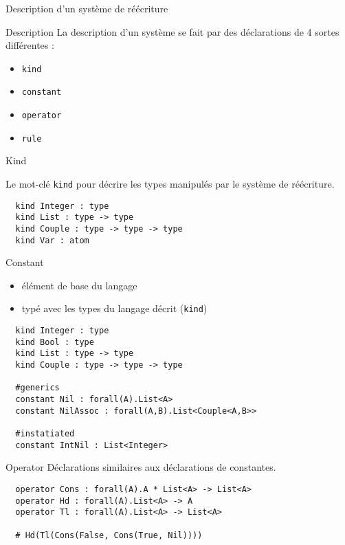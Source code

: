 \begin{frame}{Description d'un système de réécriture}
  \begin{block}{Description}
    La description d'un système se fait par des déclarations de 4
    sortes différentes :
    \begin{itemize}
    \item \verb?kind?
    \item \verb?constant?
    \item \verb?operator?
    \item \verb?rule?
    \end{itemize}
  \end{block}
\end{frame}

\begin{frame}[fragile]{Kind}

  Le mot-clé \verb?kind? pour décrire les types manipulés par le
  système de réécriture.
\begin{verbatim}
  kind Integer : type
  kind List : type -> type
  kind Couple : type -> type -> type
  kind Var : atom
\end{verbatim}
\end{frame}

\begin{frame}[fragile]{Constant}
  \begin{itemize}
  \item élément de base du langage
  \item typé avec les types du langage décrit (\verb?kind?)
  \end{itemize}

\begin{verbatim}
  kind Integer : type
  kind Bool : type
  kind List : type -> type
  kind Couple : type -> type -> type

  #generics
  constant Nil : forall(A).List<A>
  constant NilAssoc : forall(A,B).List<Couple<A,B>>

  #instatiated
  constant IntNil : List<Integer>
\end{verbatim}
\end{frame}

\begin{frame}[fragile]{Operator}
  Déclarations similaires aux déclarations de constantes.
\begin{verbatim}
  operator Cons : forall(A).A * List<A> -> List<A>
  operator Hd : forall(A).List<A> -> A
  operator Tl : forall(A).List<A> -> List<A>

  # Hd(Tl(Cons(False, Cons(True, Nil))))
\end{verbatim}
\end{frame}

